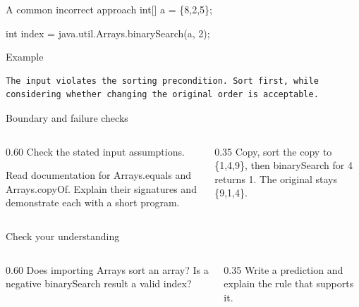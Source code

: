 \documentclass[10pt,aspectratio=169]{beamer}
\begin{document}
\begin{frame}[fragile,t]{A common incorrect approach}
int[] a = \{8,2,5\};\par int index = java.util.Arrays.binarySearch(a, 2);
\vspace{1mm}\begin{block}{Example}
\begin{lstlisting}
The input violates the sorting precondition. Sort first, while considering whether changing the original order is acceptable.
\end{lstlisting}
\end{block}
\end{frame}

\begin{frame}[fragile,t]{Boundary and failure checks}
\begin{columns}[T,onlytextwidth]\begin{column}{0.60\textwidth}
Check the stated input assumptions.

Read documentation for Arrays.equals and Arrays.copyOf. Explain their signatures and demonstrate each with a short program.
\end{column}\begin{column}{0.35\textwidth}\small
Copy, sort the copy to \{1,4,9\}, then binarySearch for 4 returns 1. The original stays \{9,1,4\}.
\end{column}\end{columns}
\end{frame}

\begin{frame}[fragile,t]{Check your understanding}
\begin{columns}[T,onlytextwidth]\begin{column}{0.60\textwidth}
Does importing Arrays sort an array? Is a negative binarySearch result a valid index?
\end{column}\begin{column}{0.35\textwidth}\small
Write a prediction and explain the rule that supports it.
\end{column}\end{columns}
\end{frame}
\end{document}
